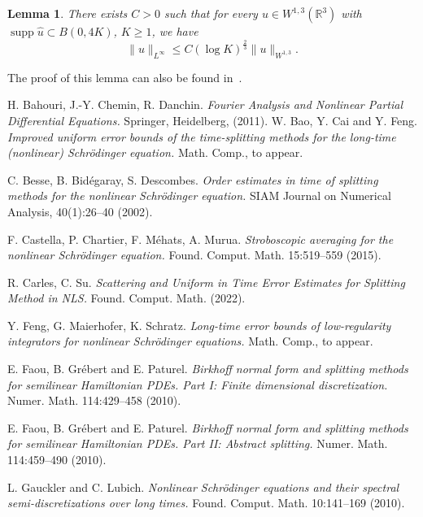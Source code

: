 \documentclass[10pt,a4paper]{article}
\newtheorem{lemma}[theorem]{Lemma}
\DeclareMathOperator{\supp}{supp}
\begin{document}
  \begin{lemma}\label{sobbord}
    There exists \(C>0\) such that for every \(u\in W^{1,3}(\mathbb R^3)\) with
    \(\supp \hat{u} \subset B(0,4K)\), \(K \geq 1\), we have
    \[ \|u\|_{L^\infty} \leq C (\log K)^\frac23 \|u\|_{W^{1,3}}. \]
  \end{lemma}

  The proof of this lemma can also be found in~\cite{ORS21}.

  \begin{thebibliography}{99}
      {\rm H. Bahouri, J.-Y. Chemin, R. Danchin.}
      {\em Fourier Analysis and Nonlinear Partial Differential Equations.}
      Springer, Heidelberg, (2011).
      {\rm W. Bao, Y. Cai and Y. Feng.}
      {\em Improved uniform error bounds of the time-splitting methods for the long-time (nonlinear) Schr\"odinger equation.}
      Math. Comp., to appear.

      {\rm C. Besse, B. Bid\'egaray, S. Descombes.}
      {\em Order estimates in time of splitting methods for the nonlinear Schr\"odinger equation.}
      SIAM Journal on Numerical Analysis, 40(1):26--40 (2002).
      
      {\rm F. Castella, P. Chartier, F. Méhats, A. Murua.}
      {\em Stroboscopic averaging for the nonlinear Schr\"odinger equation.}
      Found. Comput. Math. 15:519--559 (2015).

      {\rm R. Carles, C. Su.}
      {\em Scattering and Uniform in Time Error Estimates for Splitting Method in NLS.}
      Found. Comput. Math. (2022).

      {\rm Y. Feng, G. Maierhofer, K. Schratz.}
      {\em Long-time error bounds of low-regularity integrators for nonlinear Schrödinger equations.}
      Math. Comp., to appear.

      {\rm E. Faou, B. Grébert and E. Paturel.} 
      {\em Birkhoff normal form and splitting methods for semilinear Hamiltonian PDEs. Part I: Finite dimensional discretization.}
      Numer. Math. 114:429--458 (2010).

      {\rm E. Faou, B. Grébert and E. Paturel.} 
      {\em Birkhoff normal form and splitting methods for semilinear Hamiltonian PDEs. Part II: Abstract splitting.}
      Numer. Math. 114:459--490 (2010).

      {\rm L. Gauckler and C. Lubich.}
      {\em Nonlinear Schr\"odinger equations and their spectral semi-discretizations over long times.}
      Found. Comput. Math. 10:141--169 (2010).


\end{thebibliography}
\end{document}
